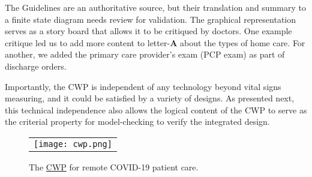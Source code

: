 The Guidelines are an authoritative source, but their translation and summary to a finite state diagram needs review for validation. 
The graphical representation serves as a story board that allows it to be critiqued by doctors. 
One example critique led us to add more content to letter-\textbf{A} about the types of home care.  
For another, we added the primary care provider's exam (PCP exam) as part of discharge orders.

Importantly, the CWP is independent of any technology beyond vital signs measuring, and it could be satisfied by a variety of designs.  
As presented next, this technical independence also allows the logical content of the CWP to serve as the criterial property for model-checking to verify the integrated design.

\begin{figure}[t]
  \begin{center}
    \begin{tabular}{c}
      \texttt{[image: cwp.png]}
    \end{tabular}
  \end{center}
\caption{The \href{https://github.com/ericmercer/SPIN-bpmn-cwp-verification-paper/blob/main/16-Feb-2022-CWP.png}{CWP} for remote COVID-19 patient care.}
\label{fig:cwp}
\end{figure}